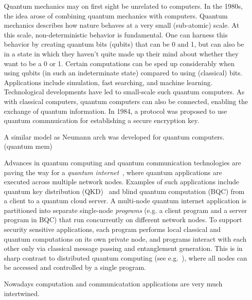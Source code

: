 Quantum mechanics may on first sight be unrelated to computers.
In the 1980s, the idea arose of combining quantum mechanics with computers.
Quantum mechanics describes how nature behaves at a very small (sub-atomic) scale.
At this scale, non-deterministic behavior is fundamental.
One can harness this behavior by creating quantum bits (qubits) that can be 0 and 1, but can also be in a state in which they haven't quite made up their mind about whether they want to be a 0 or 1.
Certain computations can be sped up considerably when using qubits (in such an indeterminate state) compared to using (classical) bits.
Applications include simulation, fast searching, and machine learning.
Technological developments have led to small-scale such quantum computers.
As with classical  computers, quantum computers can also be connected, enabling the exchange of quantum information.
In 1984, a protocol was proposed to use quantum commnuication for establishing a secure encryption key.

A similar model as Neumann arch was developed for quantum computers. (quantum mem)

Advances in quantum computing and quantum communication technologies are paving the way for a \textit{quantum internet}~\cite{wehner2018quantum, kimble2008quantum}, where quantum applications are executed across multiple network nodes.
Examples of such applications include quantum key distribution (QKD)~\cite{bennett2014quantum, ekert1991quantum} and blind quantum computation (BQC) \cite{broadbent2009universal, arrighi2006blind} from a client to a quantum cloud server.
A multi-node quantum internet application is partitioned into separate single-node \textit{programs} (e.g. a client program and a server program in BQC) that run concurrently on different network nodes. To support security sensitive applications, each program performs local classical and quantum computations on its own private node, and programs interact with each other only via classical message passing and entanglement generation. This is in sharp contrast to distributed quantum computing (see e.g.~\cite{cacciapuoti2019quantum}), where all nodes can be accessed and controlled by a single program. 

Nowadays computation and communicatation applications are very much intertwined.


